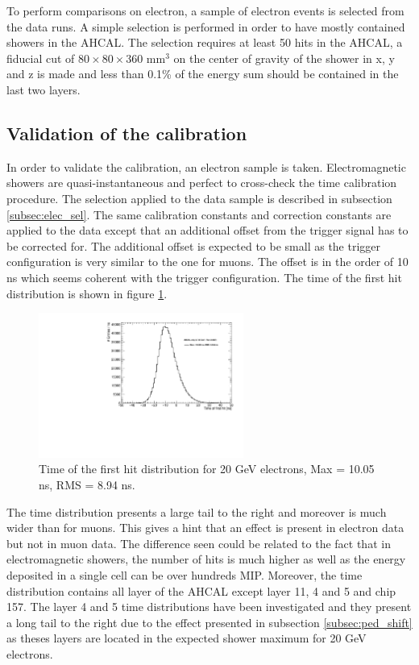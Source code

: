 \documentclass[twoside,a4paper,11pt]{article}
\begin{document}
To perform comparisons on electron, a sample of electron events is selected from the data runs. A simple selection is performed in order to have mostly contained showers in the AHCAL. The selection requires at least 50 hits in the AHCAL, a fiducial cut of $80\times80\times360$ mm$^3$ on the center of gravity of the shower in x, y and z is made and less than 0.1\% of the energy sum should be contained in the last two layers.

\subsection{Validation of the calibration}
\label{subsec:validation}

In order to validate the calibration, an electron sample is taken. Electromagnetic showers are quasi-instantaneous and perfect to cross-check the time calibration procedure. The selection applied to the data sample is described in subsection \ref{subsec:elec_sel}. The same calibration constants and correction constants are applied to the data except that an additional offset from the trigger signal has to be corrected for. The additional offset is expected to be small as the trigger configuration is very similar to the one for muons. The offset is in the order of 10 ns which seems coherent with the trigger configuration. The time of the first hit distribution is shown in figure \ref{fig:Timing_electrons}.
\begin{figure}[htbp]
\begin{center}
\includegraphics[width=0.6\textwidth]{fig/Electrons_MuonCalib/Timing_AllLayers.pdf}
\caption{Time of the first hit distribution for 20 GeV electrons, Max = 10.05 ns, RMS = 8.94 ns.}
\label{fig:Timing_electrons}
\end{center}
\end{figure}
The time distribution presents a large tail to the right and moreover is much wider than for muons. This gives a hint that an effect is present in electron data but not in muon data. The difference seen could be related to the fact that in electromagnetic showers, the number of hits is much higher as well as the energy deposited in a single cell can be over hundreds MIP. Moreover, the time distribution contains all layer of the AHCAL except layer 11, 4 and 5 and chip 157. The layer 4 and 5 time distributions have been investigated and they present a long tail to the right due to the effect presented in subsection \ref{subsec:ped_shift} as theses layers are located in the expected shower maximum for 20 GeV electrons.
\end{document}

